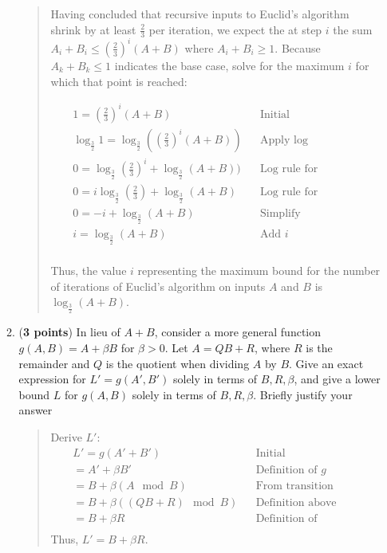 \documentclass[11pt]{article}
\begin{document}
\begin{enumerate}[leftmargin=*]
\begin{enumerate}
\begin{quote}
        \medskip
        Having concluded that recursive inputs to Euclid's algorithm shrink by at least $\frac{2}{3}$ per iteration, we expect the at step $i$ the sum $A_i + B_i \leq (\frac{2}{3})^i(A + B)$ where $A_i + B_i \geq 1$. Because $A_k + B_k \leq 1$ indicates the base case, solve for the maximum $i$ for which that point is reached:

        \begin{align*}
            && 1 = (\frac{2}{3})^i(A + B) && \text{Initial} && \\
            && \log_{\frac{3}{2}}1 = \log_{\frac{3}{2}}((\frac{2}{3})^i(A + B)) && \text{Apply log} && \\
            && 0 = \log_{\frac{3}{2}}(\frac{2}{3})^i + \log_{\frac{3}{2}}(A + B)) && \text{Log rule for multiplication} && \\
            && 0 = i\log_{\frac{3}{2}}(\frac{2}{3}) + \log_{\frac{3}{2}}(A + B) && \text{Log rule for exponents} && \\
            && 0 = -i + \log_{\frac{3}{2}}(A + B) && \text{Simplify} && \\
            && i = \log_{\frac{3}{2}}(A + B) && \text{Add $i$} && \\
        \end{align*} 

        Thus, the value $i$ representing the maximum bound for the number of iterations of Euclid's algorithm on inputs $A$ and $B$ is $\log_{\frac{3}{2}}(A + B)$. 
      \end{quote}

    \item (\textbf{3 points}) In lieu of $A+B$, consider a more general function $g(A,B) = A + \beta B$ for $\beta > 0$. Let $A = QB+R$, where $R$ is the remainder and $Q$ is the quotient when dividing $A$ by $B$. Give an exact expression for $L' = g(A',B')$ solely in terms of $B,R,\beta$, and give a lower bound $L$ for $g(A,B)$ solely in terms of $B, R, \beta$. Briefly justify your answer
      \begin{quote}
        \color{purple}
        Derive $L'$:
        \begin{align*}
            && L' = g(A' + B') && \text{Initial} && \\
            && = A' + \beta B' && \text{Definition of $g$} && \\
            && = B + \beta (A \mod B) && \text{From transition relation} && \\
            && = B + \beta ((QB + R) \mod B) && \text{Definition above} && \\
            && = B + \beta R && \text{Definition of remainder} && \\
        \end{align*} 
        Thus, $L' = B + \beta R$.


\end{quote}
\end{enumerate}
\end{enumerate}
\end{document}
